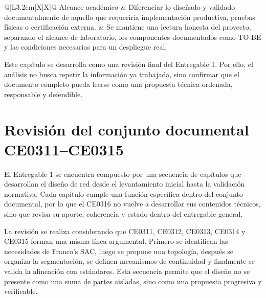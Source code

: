 \documentclass[11pt, a4paper, oneside]{report}
\begin{document}
\begin{xltabular}{\textwidth}{@{}|L{3.2cm}|X|X|@{}}
{\small Alcance académico} &
{\small Diferenciar lo diseñado y validado documentalmente de aquello que requeriría implementación productiva, pruebas físicas o certificación externa.} &
{\small Se mantiene una lectura honesta del proyecto, separando el alcance de laboratorio, los componentes documentados como TO-BE y las condiciones necesarias para un despliegue real.} \\ \hline

\end{xltabular}

\normalsize

Este capítulo se desarrolla como una revisión final del Entregable 1. Por ello, el análisis no busca repetir la información ya trabajada, sino confirmar que el documento completo pueda leerse como una propuesta técnica ordenada, responsable y defendible.

\section{Revisión del conjunto documental CE0311--CE0315}

El Entregable 1 se encuentra compuesto por una secuencia de capítulos que desarrollan el diseño de red desde el levantamiento inicial hasta la validación normativa. Cada capítulo cumple una función específica dentro del conjunto documental, por lo que el CE0316 no vuelve a desarrollar sus contenidos técnicos, sino que revisa su aporte, coherencia y estado dentro del entregable general.

La revisión se realiza considerando que CE0311, CE0312, CE0313, CE0314 y CE0315 forman una misma línea argumental. Primero se identifican las necesidades de Franco's SAC, luego se propone una topología, después se organiza la segmentación, se definen mecanismos de continuidad y finalmente se valida la alineación con estándares. Esta secuencia permite que el diseño no se presente como una suma de partes aisladas, sino como una propuesta progresiva y verificable.

\renewcommand{\arraystretch}{1.3}
\footnotesize
{}
\end{document}
